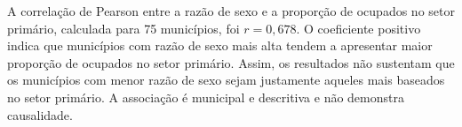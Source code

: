 A correlação de Pearson entre a razão de sexo e a proporção de ocupados no setor primário, calculada para 75 municípios, foi $r = 0{,}678$. O coeficiente positivo indica que municípios com razão de sexo mais alta tendem a apresentar maior proporção de ocupados no setor primário. Assim, os resultados não sustentam que os municípios com menor razão de sexo sejam justamente aqueles mais baseados no setor primário. A associação é municipal e descritiva e não demonstra causalidade.
